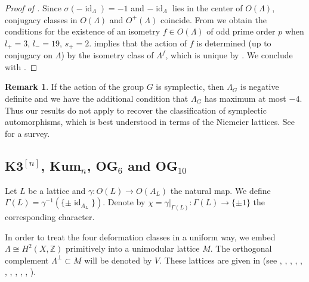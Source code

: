 \documentclass{amsart}
\theoremstyle{definition}
\newtheorem{remark}[definition]{Remark}
\theoremstyle{plain}
\DeclareMathOperator{\id}{id}
\newcommand{\ZZ}{\mathbb{Z}}
\begin{document}
\begin{proof}[Proof of ]

Since $\sigma(-\id_\Lambda)=-1$ and $-\id_\Lambda$ lies in the center of $O(\Lambda)$, conjugacy classes in $O(\Lambda)$ and $O^+(\Lambda)$ coincide.
From   we obtain the conditions for the existence of an isometry $f \in O(\Lambda)$ of odd prime order $p$ when $l_+ = 3$, $l_- = 19$, $s_+ = 2$.  implies that
the action of $f$ is determined (up to conjugacy on $\Lambda$) by the isometry class of $\Lambda^f$, which is unique by . We conclude with .
\end{proof}
\begin{remark}
 If the action of the group $G$ is symplectic, then $\Lambda_G$ is negative definite and we have the additional condition that
 $\Lambda_G$ has maximum at most $-4$. Thus our results do not apply
 to recover the classification of symplectic automorphisms, which is best understood in terms of the Niemeier lattices.
 See \cite{kondo} for a survey.
\end{remark}

\subsection{\texorpdfstring{K3$^{[n]}$}{K3 n}, \texorpdfstring{Kum$_n$}{Kum n}, \texorpdfstring{OG$_6$}{OG6} and \texorpdfstring{OG$_{10}$}{OG10}}\label{subsec: k3n}
Let $L$ be a lattice and
$\gamma: O(L) \rightarrow O(A_L)$
the natural map.
We define $\Gamma(L)=\gamma^{-1}(\{\pm \id_{A_L}\})$. Denote by $\chi = \gamma|_{\Gamma(L)}\colon\Gamma(L) \rightarrow \{\pm 1\}$
the corresponding character.

In order to treat the four deformation classes in a uniform way, we embed $\Lambda\cong H^2(X,\ZZ)$ primitively into a unimodular lattice $M$. The orthogonal complement $\Lambda^\perp \subset M$ will be denoted by $V$. These lattices are given in  (see \cite{beauville}, \cite{rapagnetta_OG6}, \cite{rapagnetta_OG10}, \cite[Lem.\ 9.2]{markman}, \cite[Cor.\ 4.8]{markman_mehrotra}, \cite[Thm.\ 4.3]{mongardi:monodromy}, \cite{mongardi_rapagnetta}, \cite{onorati}, \cite[Prop.\ 10]{beauville_rmks}, \cite[Cor.\ 5]{bnws_kum}, \cite{mongardi_wandel_OG}).
\end{document}
